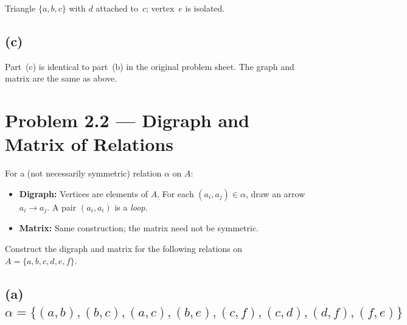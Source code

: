 \documentclass[12pt, a4paper]{article}
\begin{document}
Triangle $\{a,b,c\}$ with $d$ attached to~$c$; vertex~$e$ is isolated.

\subsection*{(c)}

Part~(c) is identical to part~(b) in the original problem sheet.  The graph and matrix are the same as above.

\newpage
\section{Problem 2.2 --- Digraph and Matrix of Relations}

\begin{theorybox}
For a (not necessarily symmetric) relation $\alpha$ on $A$:
\begin{itemize}[nosep]
  \item \textbf{Digraph:} Vertices are elements of $A$.  For each $(a_i,a_j) \in \alpha$, draw an arrow $a_i \to a_j$.  A pair $(a_i,a_i)$ is a \emph{loop}.
  \item \textbf{Matrix:} Same construction; the matrix need not be symmetric.
\end{itemize}
\end{theorybox}

\begin{problembox}
Construct the digraph and matrix for the following relations on $A = \{a, b, c, d, e, f\}$.
\end{problembox}


\subsection*{(a)\; $\alpha = \{(a,b),(b,c),(a,c),(b,e),(c,f),(c,d),(d,f),(f,e)\}$}

\begin{center}
\end{center}
\end{document}

